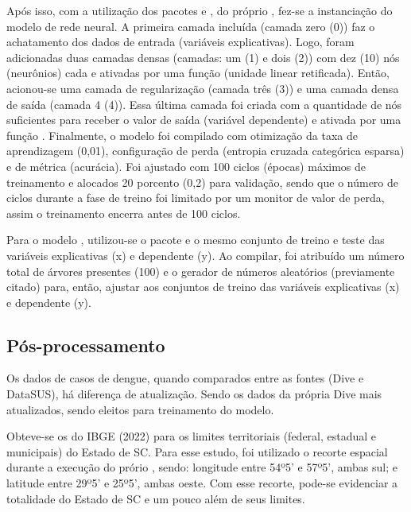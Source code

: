 \documentclass[
	12pt,				%
	openright,			%
	oneside,			%
	a4paper,			%
	english,			%
	french,				%
	spanish,			%
	brazil				%
	dvipsnames, table]{abntex2}
\begin{document}
\indent Após isso, com a utilização dos pacotes  \cite{tensorflow_2015_whitepaper} e  \cite{keras_2015_chollet}, do próprio , fez-se a instanciação do modelo de rede neural. A primeira camada incluída (camada zero (0)) faz o achatamento dos dados de entrada (variáveis explicativas). Logo, foram adicionadas duas camadas densas (camadas: um (1) e dois (2)) com dez (10) nós (neurônios) cada e ativadas por uma função  (unidade linear retificada). Então, acionou-se uma camada de regularização (camada três (3)) e uma camada densa de saída (camada 4 (4)). Essa última camada foi criada com a quantidade de nós suficientes para receber o valor de saída (variável dependente) e ativada por uma função . Finalmente, o modelo foi compilado com otimização da taxa de aprendizagem (0,01), configuração de perda (entropia cruzada categórica esparsa) e de métrica (acurácia). Foi ajustado com 100 ciclos (épocas) máximos de treinamento e alocados 20 porcento (0,2) para validação, sendo que o número de ciclos durante a fase de treino foi limitado por um monitor de valor de perda, assim o treinamento encerra antes de 100 ciclos.

\indent Para o modelo , utilizou-se o pacote  e o mesmo conjunto de treino e teste das variáveis explicativas (x) e dependente (y). Ao compilar, foi atribuído um número total de árvores presentes (100) e o gerador de números aleatórios (previamente citado) para, então, ajustar aos conjuntos de treino das variáveis explicativas (x) e dependente (y).

\subsection{Pós-processamento}

\indent Os dados de casos de dengue, quando comparados entre as fontes (\acrshort{Dive} e \acrshort{DataSUS}), há diferença de atualização. Sendo os dados da própria \acrshort{Dive} mais atualizados, sendo eleitos para treinamento do modelo.

\indent Obteve-se os  do \acrshort{IBGE} (2022) para os limites territoriais (federal, estadual e municipais) do Estado de \acrlong{SC}. Para esse estudo, foi utilizado o recorte espacial durante a execução do prório , sendo: longitude entre 54º5' e 57º5', ambas sul; e latitude entre 29º5' e 25º5', ambas oeste. Com esse recorte, pode-se evidenciar a totalidade do Estado de \acrlong{SC} e um pouco além de seus limites.
\end{document}
